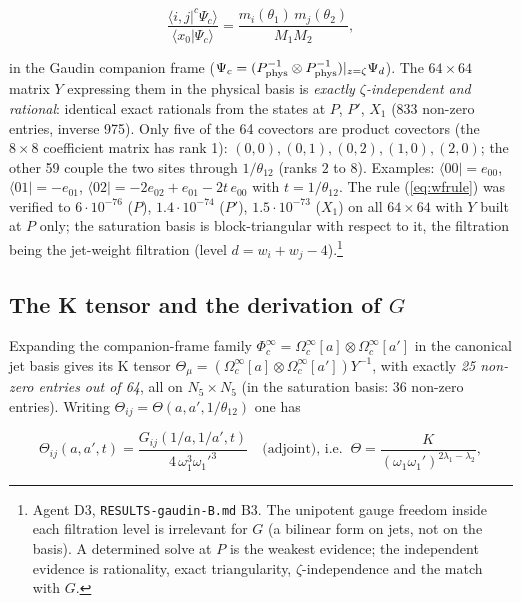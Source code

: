 \documentclass[11pt]{article}
\begin{document}
\begin{equation}
\frac{\langle i,j|^c\Psi_c\rangle}{\langle x_0|\Psi_c\rangle}=\frac{m_i(\theta_1)\,m_j(\theta_2)}{M_1M_2},\label{eq:wfrule}
\end{equation}

in the Gaudin companion frame ($\Psi_c=(P_{\rm phys}^{-1}\otimes P_{\rm phys}^{-1})|_{z=\zeta}\Psi_d$).
The $64\times64$ matrix $Y$ expressing them in the physical basis is \emph{exactly $\zeta$-independent and rational}: identical exact rationals from the states at $P$, $P'$, $X_1$ (833 non-zero entries, inverse 975).
Only five of the 64 covectors are product covectors (the $8\times8$ coefficient matrix has rank 1): $(0,0),(0,1),(0,2),(1,0),(2,0)$; the other 59 couple the two sites through $1/\theta_{12}$ (ranks $2$ to $8$).
Examples: $\langle00|=e_{00}$, $\langle01|=-e_{01}$, $\langle02|=-2e_{02}+e_{01}-2t\,e_{00}$ with $t=1/\theta_{12}$. The rule (\ref{eq:wfrule}) was verified to $6\cdot10^{-76}$ ($P$), $1.4\cdot10^{-74}$ ($P'$), $1.5\cdot10^{-73}$ ($X_1$) on all $64\times64$ with $Y$ built at $P$ only; the saturation basis is block-triangular with respect to it, the filtration being the jet-weight filtration (level $d=w_i+w_j-4$).\footnote{Agent D3, \texttt{RESULTS-\allowbreak{}gaudin-\allowbreak{}B.\allowbreak{}md} B3.
The unipotent gauge freedom inside each filtration level is irrelevant for $G$ (a bilinear form on jets, not on the basis).
A determined solve at $P$ is the weakest evidence; the independent evidence is rationality, exact triangularity, $\zeta$-independence and the match with $G$.}

\subsection{The K tensor and the derivation of \texorpdfstring{$G$}{G}}\label{sec:Ktensor}

Expanding the companion-frame family $\Phi_c^\infty=\Omega_c^\infty[a]\otimes\Omega_c^\infty[a']$ in the canonical jet basis gives its K tensor $\Theta_\mu=(\Omega_c^\infty[a]\otimes\Omega_c^\infty[a'])Y^{-1}$, with exactly \emph{25 non-zero entries out of 64}, all on $N_5\times N_5$ (in the saturation basis: 36 non-zero entries).
Writing $\Theta_{ij}=\Theta(a,a',1/\theta_{12})$ one has

\begin{equation}
\Theta_{ij}(a,a',t)=\frac{G_{ij}(1/a,1/a',t)}{4\,\omega_1^3\omega_1'^3}\quad\text{(adjoint), i.e. }\ \Theta=\frac{K}{(\omega_1\omega_1')^{2\lambda_1-\lambda_2}},\label{eq:Theta}
\end{equation}
\end{document}
